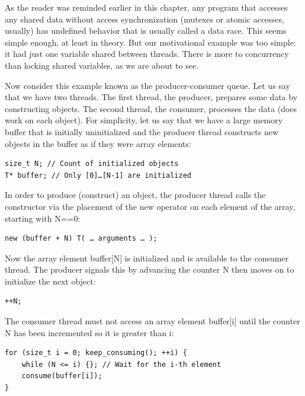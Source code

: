 
As the reader was reminded earlier in this chapter, any program that accesses any shared data without access synchronization (mutexes or atomic accesses, usually) has undefined behavior that is usually called a data race. This seems simple enough, at least in theory. But our motivational example was too simple: it had just one variable shared between threads. There is more to concurrency than locking shared variables, as we are about to see.


Now consider this example known as the producer-consumer queue. Let us say that we have two threads. The first thread, the producer, prepares some data by constructing objects. The second thread, the consumer, processes the data (does work on each object). For simplicity, let us say that we have a large memory buffer that is initially uninitialized and the producer thread constructs new objects in the buffer as if they were array elements:

\begin{lstlisting}[style=styleCXX]
size_t N; // Count of initialized objects
T* buffer; // Only [0]…[N-1] are initialized
\end{lstlisting}

In order to produce (construct) an object, the producer thread calls the constructor via the placement of the new operator on each element of the array, starting with N==0:

\begin{lstlisting}[style=styleCXX]
new (buffer + N) T( … arguments … );
\end{lstlisting}

Now the array element buffer[N] is initialized and is available to the consumer thread. The producer signals this by advancing the counter N then moves on to initialize the next object:

\begin{lstlisting}[style=styleCXX]
++N;
\end{lstlisting}

The consumer thread must not access an array element buffer[i] until the counter N has been incremented so it is greater than i:

\begin{lstlisting}[style=styleCXX]
for (size_t i = 0; keep_consuming(); ++i) {
	while (N <= i) {}; // Wait for the i-th element
	consume(buffer[i]);
}
\end{lstlisting}

